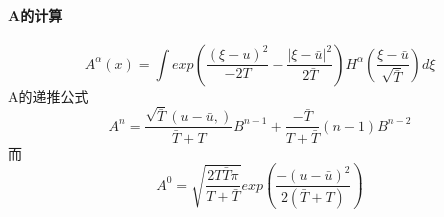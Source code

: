 \documentclass[UTF8]{ctexart}
\begin{document}
    \paragraph{A的计算}
    
    $$A^{\alpha}(x)=\int  exp(\frac{(\xi-u)^2}{-2T}-\frac{|\xi-\bar{u}|^2}{2\bar{T}})H^{\alpha}(\frac{\xi-\bar{u}}{\sqrt{\bar{T}}})d\xi$$
  A的递推公式
    $$
    A^n = \frac{\sqrt{\bar{T}}(u-\bar{u},)}{\bar{T}+T}B^{n-1}+\frac{-\bar{T}}{T+\bar{T}}(n-1)B^{n-2}
    $$
    而
    $$
    A^0 = \sqrt{\frac{2T\bar{T}\pi}{T+\bar{T}}}exp(\frac{-(u-\bar{u})^2}{2(\bar{T}+T)})
    $$
    
  
\end{document}
